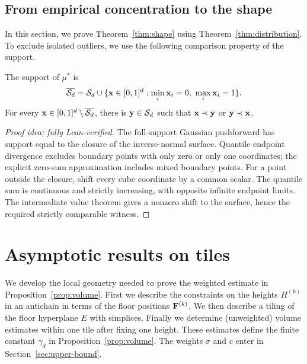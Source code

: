 \documentclass[11pt,letterpaper]{article}
\begin{document}
\subsection{From empirical concentration to the shape}

In this section, we prove Theorem~\ref{thm:shape} using Theorem~\ref{thm:distribution}. To exclude isolated outliers, we use the following comparison property of the support.

\begin{lemma}\label{lem:support}
      The support of $\mu^\ast$ is
      \begin{equation}\label{eq:closure}
            \overline{\cS_d} =\cS_d\cup\{\vx\in[0,1]^d:\min_i\vx_i=0,\ \max_i\vx_i=1\}.
      \end{equation}
      For every $\mathbf x\in[0,1]^d\setminus\overline{\mathcal S_d}$, there is $\mathbf y\in\mathcal S_d$ such that $\mathbf x\prec\mathbf y$ or $\mathbf y\prec\mathbf x$.
\end{lemma}

\begin{proof}[Proof idea; fully Lean-verified]
The full-support Gaussian pushforward has support equal to the closure of the inverse-normal surface. Quantile endpoint divergence excludes boundary points with only zero or only one coordinates; the explicit zero-sum approximation includes mixed boundary points. For a point outside the closure, shift every cube coordinate by a common scalar. The quantile sum is continuous and strictly increasing, with opposite infinite endpoint limits. The intermediate value theorem gives a nonzero shift to the surface, hence the required strictly comparable witness.
\end{proof}


\section{Asymptotic results on tiles}\label{sec:counting_proof}

We develop the local geometry needed to prove the weighted estimate in Proposition~\ref{prop:volume}. First we describe the constraints on the heights $H^{(k)}$ in an antichain in terms of the floor positions $\mathbf F^{(k)}$. We then describe a tiling of the floor hyperplane $E$ with simplices. Finally we determine (unweighted) volume estimates within one tile after fixing one height. These estimates define the finite constant $\gamma_d$ in Proposition~\ref{prop:volume}. The weights $\sigma$ and $c$ enter in Section~\ref{sec:upper-bound}.
\end{document}
